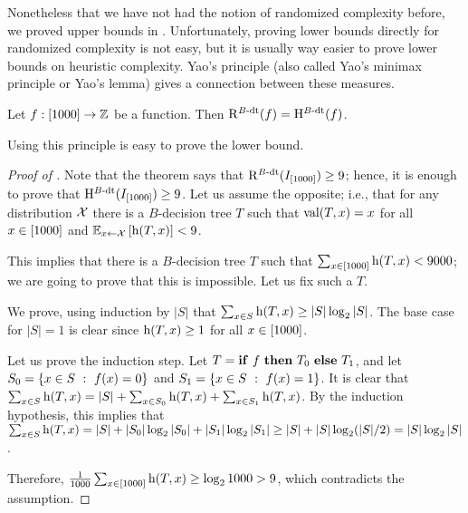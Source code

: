 Nonetheless that we have not had the notion of randomized complexity before, we
proved upper bounds in . Unfortunately, proving lower
bounds directly for randomized complexity is not easy, but it is usually way
easier to prove lower bounds on heuristic complexity. Yao's principle (also
called Yao's minimax principle or Yao's lemma) gives a connection between these
measures.
\begin{theorem}
  Let $f : [1000] \to {\mathbb{Z}}$ be a function. Then $\mathrm{R}^{B\text{-}\mathrm{dt}}({f}) = 
  \mathrm{H}_{ }^{B\text{-}\mathrm{dt}}({f})$.
\end{theorem}


Using this principle is easy to prove the lower bound.
\begin{proof}[Proof of ]
  Note that the theorem says that $\mathrm{R}^{B\text{-}\mathrm{dt}}({I_{{[{1000}]}}}) \ge 9$;
  hence, it is enough to prove that $\mathrm{H}_{ }^{B\text{-}\mathrm{dt}}({I_{{[{1000}]}}}) \ge 9$.
  Let us assume the opposite; i.e., that for any distribution $\mathcal{X}$
  there is a $B$-decision tree $T$ such that $\mathrm{val}({T}, {x}) = x$ for all $x \in
  {[{1000}]}$ and $\expectation[x \gets \Distribution{X}]{\DTHeight[x]{T}} <
  9$.

  This implies that there is a $B$-decision tree $T$ such that 
  $\sum_{x \in \range{1000}} \DTHeight[x]{T} < 9000$; we are going to prove that
  this is impossible. Let us fix such a $T$.

  We prove, using induction by $|S|$ that $\sum_{x \in S} \DTHeight[x]{T} \ge
  |S| \log_2 |S|$. The base case for $|S| = 1$ is clear since 
  $\DTHeight[x]{T} \ge 1$ for all $x \in {[{1000}]}$. 
  
  Let us prove the induction step. Let $T = \mathbf{if}~{f}~\mathbf{then}~{T_0}~\mathbf{else}~{T_1}$, and let 
  $S_0 = \set[f(x) = 0]{x \in S}$ and $S_1 = \set[f(x) = 1]{x \in S}$.
  It is clear that $\sum_{x \in S} \DTHeight[x]{T} = |S| + 
  \sum_{x \in S_0} \DTHeight[x]{T} + \sum_{x \in S_1} \DTHeight[x]{T}$. By the
  induction hypothesis, this implies that $\sum_{x \in S} \DTHeight[x]{T} = |S|
  + |S_0| \log_2 |S_0| + |S_1| \log_2 |S_1| \ge |S| + |S| \log_2 (|S| / 2) =
  |S| \log_2 |S|$.

  Therefore, $\frac{1}{1000} \sum_{x \in \range{1000}} \DTHeight[x]{T} \ge
  \log_2 1000 > 9$, which contradicts the assumption.
\end{proof}
